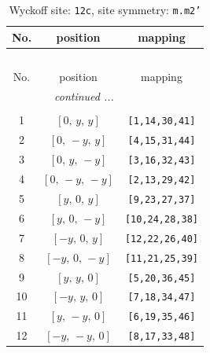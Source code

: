 \documentclass[fleqn,8pt]{jsarticle}
\begin{document}
\begin{longtable}{ccc}
\caption{Wyckoff site: {\tt 12c}, site symmetry: {\tt m.m2'}}
 \\
 \hline \hline
No. & position & mapping \\ \hline \endfirsthead

\multicolumn{2}{l}{\tablename\ \thetable{}} \\
 \hline \hline
No. & position & mapping \\ \hline \endhead

 \hline \hline
\multicolumn{2}{r}{\footnotesize\it continued ...} \\ \endfoot

 \hline \hline
\multicolumn{2}{r}{} \\ \endlastfoot

1 & $\left[ 0,\, y,\, y \right]$ & {\tt [1,14,30,41]} \\ \hline
2 & $\left[ 0,\, - y,\, y \right]$ & {\tt [4,15,31,44]} \\ \hline
3 & $\left[ 0,\, y,\, - y \right]$ & {\tt [3,16,32,43]} \\ \hline
4 & $\left[ 0,\, - y,\, - y \right]$ & {\tt [2,13,29,42]} \\ \hline
5 & $\left[ y,\, 0,\, y \right]$ & {\tt [9,23,27,37]} \\ \hline
6 & $\left[ y,\, 0,\, - y \right]$ & {\tt [10,24,28,38]} \\ \hline
7 & $\left[ - y,\, 0,\, y \right]$ & {\tt [12,22,26,40]} \\ \hline
8 & $\left[ - y,\, 0,\, - y \right]$ & {\tt [11,21,25,39]} \\ \hline
9 & $\left[ y,\, y,\, 0 \right]$ & {\tt [5,20,36,45]} \\ \hline
10 & $\left[ - y,\, y,\, 0 \right]$ & {\tt [7,18,34,47]} \\ \hline
11 & $\left[ y,\, - y,\, 0 \right]$ & {\tt [6,19,35,46]} \\ \hline
12 & $\left[ - y,\, - y,\, 0 \right]$ & {\tt [8,17,33,48]} \\
\end{longtable}
\renewcommand{\arraystretch}{1.2}
\end{document}
